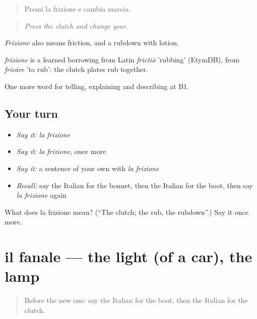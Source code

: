 \begin{quote}
Premi la frizione e cambia marcia.
\end{quote}

\begin{quote}
\emph{Press the clutch and change gear.}
\end{quote}

\emph{Frizione} also means friction, and a rubdown with lotion.

\begin{cousinweb}
\emph{frizione} is a learned borrowing from Latin \emph{frictiō} 'rubbing' (EtymDB), from \emph{fricāre} 'to rub': the clutch plates rub together.
\end{cousinweb}

\begin{grammarlens}[title={What you've built}]
One more word for telling, explaining and describing at B1.
\end{grammarlens}

\subsection*{Your turn}
\begin{itemize}
\raggedright
  \item \emph{Say it:} \emph{la frizione}
  \item \emph{Say it:} \emph{la frizione}, once more
  \item \emph{Say it:} a sentence of your own with \emph{la frizione}
  \item \emph{Recall:} say the Italian for the bonnet, then the Italian for the boot, then say \emph{la frizione} again
\end{itemize}

\begin{tcolorbox}[breakable,colback=teal!4,colframe=teal!35!black,title={Before you move on}]
What does la frizione mean? (\textquotedblleft{}The clutch; the rub, the rubdown\textquotedblright{}.) Say it once more.
\end{tcolorbox}
\section[il fanale]{il fanale — the light (of a car), the lamp}

\label{lesson:IT-C411-fanale}



\begin{quote}
Before the new one: say the Italian for the boot, then the Italian for the clutch.
\end{quote}

